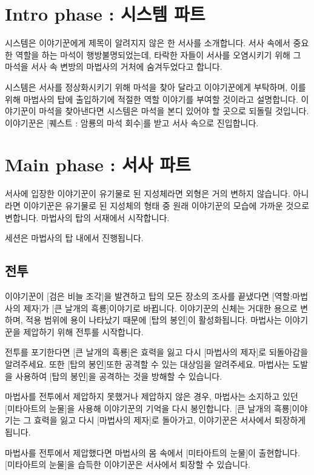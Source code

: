 \documentclass{report}
\begin{document}
	\section{Intro phase : 시스템 파트}
		시스템은 이야기꾼에게 제목이 알려지지 않은 한 서사를 소개합니다. 서사 속에서 중요한 역할을 하는 마석이 행방불명되었는데, 타락한 자들이 서사를 오염시키기 위해 그 마석을 서사 속 변방의 마법사의 거처에 숨겨두었다고 합니다.
		
		시스템은 서사를 정상화시키기 위해 마석을 찾아 달라고 이야기꾼에게 부탁하며, 이를 위해 마법사의 탑에 출입하기에 적절한 역할 이야기를 부여할 것이라고 설명합니다. 이야기꾼이 마석을 찾아낸다면 시스템은 마석을 본디 있어야 할 곳으로 되돌릴 것입니다. 이야기꾼은 [퀘스트 : 암룡의 마석 회수]를 받고 서사 속으로 진입합니다.
	
	\section{Main phase : 서사 파트}
		서사에 입장한 이야기꾼이 유기물로 된 지성체라면 외형은 거의 변하지 않습니다. 아니라면 이야기꾼은 유기물로 된 지성체의 형태 중 원래 이야기꾼의 모습에 가까운 것으로 변합니다. 마법사의 탑의 서재에서 시작합니다.  
		
		세션은 마법사의 탑 내에서 진행됩니다.
		
			\subsection{전투}
				이야기꾼이 [검은 비늘 조각]을 발견하고 탑의 모든 장소의 조사를 끝냈다면 [역할:마법사의 제자]가 [큰 날개의 흑룡]이야기로 바뀝니다. 이야기꾼의 신체는 거대한 용으로 변하며, 적용 범위에 용이 나타났기 때문에 [탑의 봉인]이 활성화됩니다. 마법사는 이야기꾼을 제압하기 위해 전투를 시작합니다.
				
				전투를 포기한다면 [큰 날개의 흑룡]은 효력을 잃고 다시 [마법사의 제자]로 되돌아감을 알려주세요. 또한 [탑의 봉인]또한 공격할 수 있는 대상임을 알려주세요. 마법사는 도발을 사용하여 [탑의 봉인]을 공격하는 것을 방해할 수 있습니다.
				
				마법사를 전투에서 제압하지 못했거나 제압하지 않은 경우, 마법사는 소지하고 있던 [미타아트의 눈물]을 사용해 이야기꾼의 기억을 다시 봉인합니다. [큰 날개의 흑룡]이야기는 그 효력을 잃고 다시 [마법사의 제자]로 돌아가고, 이야기꾼은 서사에서 퇴장하게 됩니다.
				
				마법사를 전투에서 제압했다면 마법사의 몸 속에서 [미타아트의 눈물]이 출현합니다. [미타아트의 눈물]을 습득한 이야기꾼은 서사에서 퇴장할 수 있습니다.
	
\end{document}
